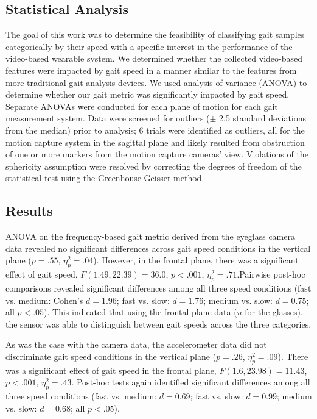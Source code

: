 \documentclass[12pt]{report}
\begin{document}
\subsection{Statistical Analysis}
The goal of this work was to determine the feasibility of classifying gait samples categorically by their speed with a specific interest in the performance of the video-based wearable system. We determined whether the collected video-based features were impacted by gait speed in a manner similar to the features from more traditional gait analysis devices. We used analysis of variance (ANOVA) to determine whether our gait metric was significantly impacted by gait speed. Separate ANOVAs were conducted for each plane of motion for each gait measurement system. Data were screened for outliers ($\pm$ 2.5 standard deviations from the median) prior to analysis; 6 trials were identified as outliers, all for the motion capture system in the sagittal plane and likely resulted from obstruction of one or more markers from the motion capture cameras' view. Violations of the sphericity assumption were resolved by correcting the degrees of freedom of the statistical test using the Greenhouse-Geisser method.

\subsection{Results}
ANOVA on the frequency-based gait metric derived from the eyeglass camera data revealed no significant differences across gait speed conditions in the vertical plane ($p= .55$, $\eta^2_p = .04$). However, in the frontal plane, there was a significant effect of gait speed, $F(1.49, 22.39) = 36.0$, $p < .001$, $\eta^2_p = .71$.Pairwise post-hoc comparisons revealed significant differences among all three speed conditions (fast vs. medium: Cohen's $d= 1.96$; fast vs. slow: $d= 1.76$; medium vs. slow: $d= 0.75$; all $p< .05$). This indicated that using the frontal plane data ($u$ for the glasses), the sensor was able to distinguish between gait speeds across the three categories. 
 
As was the case with the camera data, the accelerometer data did not discriminate gait speed conditions in the vertical plane ($p= .26$, $\eta^2_p = .09$). There was a significant effect of gait speed in the frontal plane, $F(1.6, 23.98) = 11.43$, $p < .001$, $\eta^2_p = .43$. Post-hoc tests again identified significant differences among all three speed conditions (fast vs. medium: $d = 0.69$; fast vs. slow: $d= 0.99$; medium vs. slow: $d= 0.68$; all $p < .05$).
 
\end{document}
